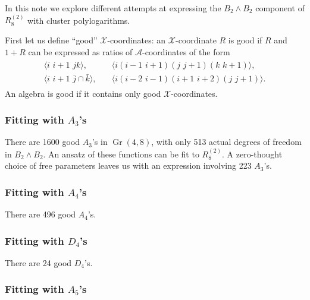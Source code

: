 \documentclass[12pt]{article}
\DeclareMathOperator{\Gr}{Gr}
\def\ket#1{\langle #1 \rangle}
\begin{document}
\thispagestyle{fancyplain}
 
\fancyhf{}
 
\cfoot{\fancyplain{}{\thepage}}


In this note we explore different attempts at expressing the $B_2\wedge B_2$ component of $R^{(2)}_8$ with cluster polylogarithms.

First let us define ``good'' $\mathcal{X}$-coordinates: an $\mathcal{X}$-coordinate $R$ is good if $R$ and $1+R$ can be expressed as ratios of $\mathcal{A}$-coordinates of the form
\begin{align}\label{def:letters}
\begin{split}
\ket{i\,\,i{+}1\,\,jk},& \quad 
\ket{i(i{-}1\,\,i{+}1)(j\,\,j{+}1)(k\,\,k{+}1)}, \\ 
\ket{i\,\,i{+}1\,\,\bar{j}\cap\bar{k}},& \quad
\ket{i(i{-}2\,\,i{-}1)(i{+}1\,\,i{+}2)(j\,\,j{+}1)}.
\end{split}
\end{align}
An algebra is good if it contains only good $\mathcal{X}$-coordinates. 

\subsubsection*{Fitting with $A_3$'s}

There are 1600 good $A_3$'s in $\Gr(4,8)$, with only 513 actual degrees of freedom in $B_2\wedge B_2$. An ansatz of these functions can be fit to $R^{(2)}_8$. A zero-thought choice of free parameters leaves us with an expression involving 223 $A_3$'s.

\subsubsection*{Fitting with $A_4$'s}

There are 496 good $A_4$'s. 

\subsubsection*{Fitting with $D_4$'s}

There are 24 good $D_4$'s. 

\subsubsection*{Fitting with $A_5$'s}
\end{document}
